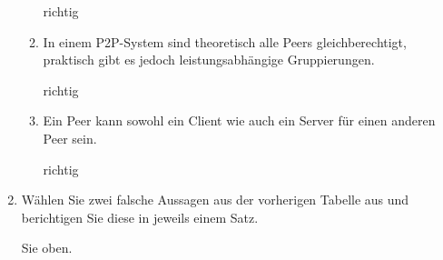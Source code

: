 \documentclass{lehramt-informatik-aufgabe}
\begin{document}
\begin{enumerate}
\begin{enumerate}
\begin{liAntwort}
richtig
\end{liAntwort}

\item In einem P2P-System sind theoretisch alle Peers
gleichberechtigt, praktisch gibt es jedoch
leistungsabhängige Gruppierungen.

\begin{liAntwort}
richtig
\end{liAntwort}

\item Ein Peer kann sowohl ein Client wie auch ein Server für
einen anderen Peer sein.

\begin{liAntwort}
richtig
\end{liAntwort}
\end{enumerate}


\item Wählen Sie zwei falsche Aussagen aus der vorherigen Tabelle aus
und berichtigen Sie diese in jeweils einem Satz.

\begin{liAntwort}
Sie oben.
\end{liAntwort}
\end{enumerate}
\end{document}
